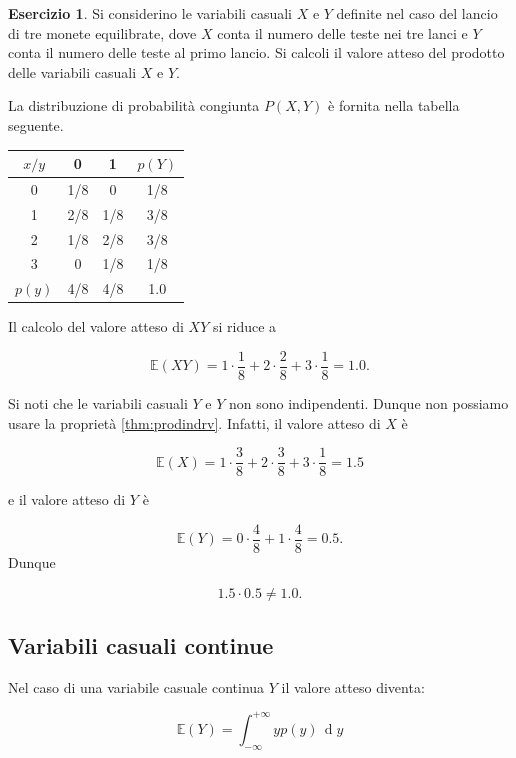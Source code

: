\documentclass[
  11pt,
]{krantz}
\newcommand{\E}{\mathbb{E}} %
\theoremstyle{definition}
\theoremstyle{definition}
\theoremstyle{definition}
\newtheorem{exercise}{Esercizio}[chapter]
\theoremstyle{definition}
\theoremstyle{remark}
\begin{document}
\begin{exercise}
Si considerino le variabili casuali \(X\) e \(Y\) definite nel caso del lancio di tre monete equilibrate, dove \(X\) conta il numero delle teste nei tre lanci e \(Y\) conta il numero delle teste al primo lancio. Si calcoli il valore atteso del prodotto delle variabili casuali \(X\) e \(Y\).

La distribuzione di probabilità congiunta \(P(X, Y)\) è fornita nella tabella seguente.

\begin{longtable}[]{@{}cccc@{}}
\toprule
\(x/ y\) & 0 & 1 & \(p(Y)\) \\
\midrule
\endhead
0 & 1/8 & 0 & 1/8 \\
1 & 2/8 & 1/8 & 3/8 \\
2 & 1/8 & 2/8 & 3/8 \\
3 & 0 & 1/8 & 1/8 \\
\(p(y)\) & 4/8 & 4/8 & 1.0 \\
\bottomrule
\end{longtable}

\noindent Il calcolo del valore atteso di \(XY\) si riduce a

\[
\E(XY) = 1 \cdot \frac{1}{8} + 2 \cdot \frac{2}{8} + 3 \cdot \frac{1}{8} = 1.0.
\]

Si noti che le variabili casuali \(Y\) e \(Y\) non sono indipendenti. Dunque non possiamo usare la proprietà \ref{thm:prodindrv}. Infatti, il valore atteso di \(X\) è

\[
\E(X) = 1 \cdot \frac{3}{8} + 2 \cdot \frac{3}{8} + 3 \cdot \frac{1}{8} = 1.5
\]

e il valore atteso di \(Y\) è

\[
\E(Y) = 0 \cdot \frac{4}{8} + 1 \cdot \frac{4}{8} = 0.5.
\] Dunque

\[
1.5 \cdot 0.5 \neq 1.0.
\]
\end{exercise}

\hypertarget{variabili-casuali-continue}{%
\subsection{Variabili casuali continue}\label{variabili-casuali-continue}}

Nel caso di una variabile casuale continua \(Y\) il valore atteso diventa:

\begin{equation}
\E(Y) = \int_{-\infty}^{+\infty} y p(y) \,\operatorname {d}\!y
\label{eq:def-ev-rv-cont}
\end{equation}
\end{document}
